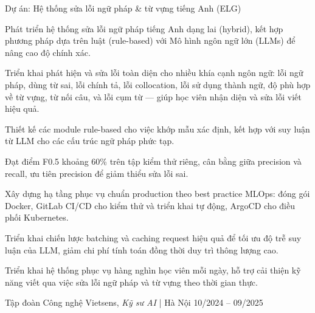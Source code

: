 \begin{cventries}
\vspace{8pt}

  \cventry
    {Dự án: Hệ thống sửa lỗi ngữ pháp \& từ vựng tiếng Anh (ELG)}
    {}
    {
      \begin{cvitems}
        \item {Phát triển hệ thống sửa lỗi ngữ pháp tiếng Anh dạng lai (hybrid), kết hợp phương pháp dựa trên luật (rule-based) với Mô hình ngôn ngữ lớn (LLMs) để nâng cao độ chính xác.}
        \item {Triển khai phát hiện và sửa lỗi toàn diện cho nhiều khía cạnh ngôn ngữ: lỗi ngữ pháp, dùng từ sai, lỗi chính tả, lỗi collocation, lỗi sử dụng thành ngữ, độ phù hợp về từ vựng, từ nối câu, và lỗi cụm từ — giúp học viên nhận diện và sửa lỗi viết hiệu quả.}
        \item {Thiết kế các module rule-based cho việc khớp mẫu xác định, kết hợp với suy luận từ LLM cho các cấu trúc ngữ pháp phức tạp.}
        \item {Đạt điểm F0.5 khoảng 60\% trên tập kiểm thử riêng, cân bằng giữa precision và recall, ưu tiên precision để giảm thiểu sửa lỗi sai.}
        \item {Xây dựng hạ tầng phục vụ chuẩn production theo best practice MLOps: đóng gói Docker, GitLab CI/CD cho kiểm thử và triển khai tự động, ArgoCD cho điều phối Kubernetes.}
        \item {Triển khai chiến lược batching và caching request hiệu quả để tối ưu độ trễ suy luận của LLM, giảm chi phí tính toán đồng thời duy trì thông lượng cao.}
        \item {Triển khai hệ thống phục vụ hàng nghìn học viên mỗi ngày, hỗ trợ cải thiện kỹ năng viết qua việc sửa lỗi ngữ pháp và từ vựng theo thời gian thực.}
      \end{cvitems}
    }

\end{cventries}

\vspace{8pt}
\newpage

\begin{cventries2}

  \cventrynew
  {Tập đoàn Công nghệ Vietsens, \textnormal{\textit{Kỹ sư AI} | Hà Nội}}
  {10/2024 -- 09/2025}
  {}

\end{cventries2}

\vspace{-10pt}

